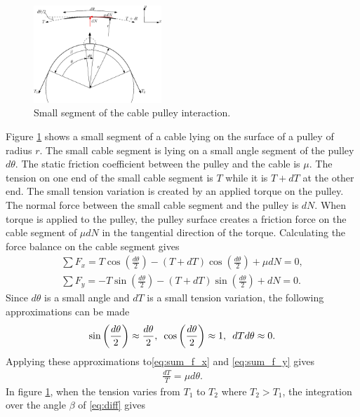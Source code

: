 \documentclass[twocolumn,10pt]{asme2ej}
\newcommand{\hquad}{\hspace{0.5em}}
\begin{document}
\begin{figure}
    \centering
    \includegraphics[width = 0.43\textwidth]{capstan_equation.eps}
    \caption{Small segment of the cable pulley interaction.}
    \label{fig:friction_fig}
\end{figure}
\par
Figure \ref{fig:friction_fig} shows a small  segment of a cable lying on the surface of a pulley of radius $r$. The small cable segment is lying on a small angle segment of the pulley $d\theta$. The static friction coefficient between the pulley and the cable is $\mu$. The tension on one end of the small cable segment is $T$ while it is $T+dT$ at the other end. The small tension variation is created by an applied torque on the pulley. The normal force between the small cable segment and the pulley  is $dN$. When torque is applied to the pulley, the pulley surface creates a friction force on the cable segment of $\mu dN$ in the tangential direction of the torque. Calculating the force balance on the cable segment gives 
\begin{align}
    \sum F_x = T\cos\left(\frac{d\theta}{2}\right) - (T+dT)\cos\left(\frac{d\theta}{2}\right) + \mu dN =0,\label{eq:sum_f_x}\\
    \sum F_y = -T\sin\left(\frac{d\theta}{2}\right)-(T+dT)\sin\left(\frac{d\theta}{2}\right)+dN = 0.\label{eq:sum_f_y}
\end{align}
Since $d\theta$ is a small angle and $dT$ is a small tension variation, the following approximations can be made
\begin{align}
    \sin\left(\frac{d\theta}{2}\right)\approx \frac{d\theta}{2},\hquad \cos\left(\frac{d\theta}{2}\right)\approx 1,\hquad dTd\theta \approx 0. 
\end{align}
Applying these approximations to\eqref{eq:sum_f_x} and \eqref{eq:sum_f_y} gives
\begin{align}
    \frac{dT}{T} = \mu d\theta. \label{eq:diff}
\end{align}
In figure \ref{fig:friction_fig}, when the tension varies from $T_1$ to $T_2$ where $T_2>T_1$, the integration over the angle $\beta$ of \eqref{eq:diff} gives
\end{document}
